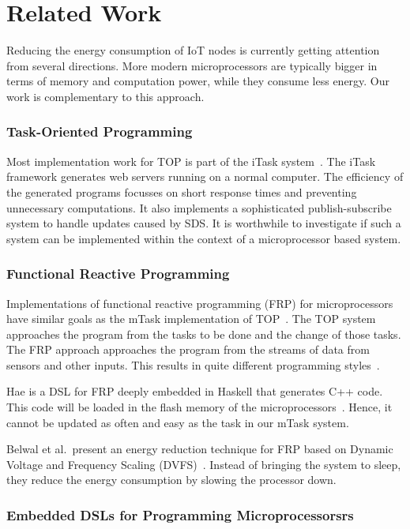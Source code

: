 \documentclass[runningheads]{llncs}
\begin{document}
\section{Related Work}

Reducing the energy consumption of IoT nodes is currently getting attention from several directions.
More modern microprocessors are typically bigger in terms of memory and computation power, while they consume less energy.
Our work is complementary to this approach.

\subsubsection{Task-Oriented Programming}

Most implementation work for TOP is part of the iTask system~\cite{TOP-ICFP07,TOP-PPDP12}.
The iTask framework generates web servers running on a normal computer.
The efficiency of the generated programs focusses on short response times and preventing unnecessary computations.
It also implements a sophisticated publish-subscribe system to handle updates caused by {SDS}.
It is worthwhile to investigate if such a system can be implemented within the context of a microprocessor based system.

\subsubsection{Functional Reactive Programming}

Implementations of functional reactive programming (FRP) for microprocessors have similar goals as the mTask implementation of TOP~\cite{ElliottHudak97:Fran}.
The TOP system approaches the program from the tasks to be done and the change of those tasks.
The FRP approach approaches the program from the streams of data from sensors and other inputs.
This results in quite different programming styles~\cite{frp_vs_top}.

Hae is a DSL for FRP deeply embedded in Haskell that generates C++ code.
This code will be loaded in the flash memory of the microprocessors~\cite{Hae}.
Hence, it cannot be updated as often and easy as the task in our mTask system.

Belwal et al.\ present an energy reduction technique for FRP based on Dynamic Voltage and Frequency Scaling (DVFS)~\cite{dvfs_frp}. Instead of bringing the system to sleep, they reduce the energy consumption by slowing the processor down.

\subsubsection{Embedded DSLs for Programming Microprocessorsrs}
\end{document}
